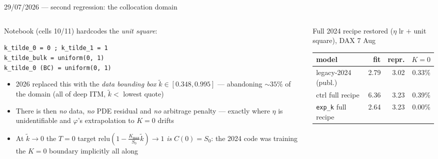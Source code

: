 \documentclass[aspectratio=169,11pt]{beamer}
\newcommand{\gold}[1]{{\color{ntugold}#1}}
\newcommand{\red}[1]{{\color{ntured}#1}}
\begin{document}
\begin{frame}{29/07/2026 --- second regression: the collocation domain}
  \begin{columns}[T]
    \begin{column}{0.48\linewidth}
      \gold{Notebook} (cells 10/11) hardcodes the \emph{unit square}:
      \begin{center}\tiny
      \begin{minipage}{0.97\linewidth}
      \texttt{k\_tilde\_0 = 0 ;\; k\_tilde\_1 = 1}\\
      \texttt{k\_tilde\_bulk = uniform(0, 1)}\\
      \texttt{k\_tilde\_0 (BC) = uniform(0, 1)}\;\red{$\leftarrow$ reaches $k{=}0$}
      \end{minipage}
      \end{center}
      \begin{itemize}\scriptsize
        \item 2026 replaced this with the \emph{data bounding box}
              $\tilde k\in[0.348,0.995]$ --- abandoning \red{$\sim\!35\%$} of the domain
              (all of deep ITM, $\tilde k<$ lowest quote)
        \item There is then \emph{no} data, \emph{no} PDE residual and \emph{no} arbitrage
              penalty --- exactly where $\eta$ is unidentifiable and $\varphi$'s
              extrapolation to $K{=}0$ drifts
        \item At $\tilde k\!\to\!0$ the $T{=}0$ target
              $\mathrm{relu}(1-\tfrac{K_{\max}}{S_0}\tilde k)\to1$ \emph{is}
              $C(0){=}S_0$: the 2024 code was training the $K{=}0$ boundary
              \gold{implicitly all along}
      \end{itemize}
    \end{column}
    \begin{column}{0.48\linewidth}
      \gold{Full 2024 recipe restored} ($\eta$ lr $+$ unit square), DAX 7 Aug
      \begin{center}\scriptsize
      \begin{tabular}{lrrr}
        \toprule
        model & fit & repr. & $K{=}0$ \\
        \midrule
        legacy-2024 (publ.) & 2.79 & \gold{3.02} & 0.33\% \\
        \midrule
        ctrl  full recipe & 6.36 & \gold{3.23} & \gold{0.39\%} \\
        \texttt{exp\_k} full recipe & \red{2.64} & \red{3.23} & \red{0.00\%} \\
        \midrule

\end{tabular}
\end{center}
\end{column}
\end{columns}
\end{frame}
\end{document}
